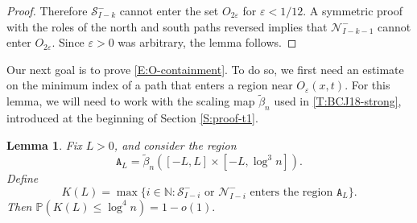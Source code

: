\documentclass[11pt,twoside]{amsart}
\theoremstyle{plain}
\newtheorem{lem}[thm]{Lemma}
\numberwithin{quest}{section}
\theoremstyle{remark}
\numberwithin{rem}{section}
\theoremstyle{definition}
\newcommand{\eps}{\varepsilon}
\newcommand{\N}{\mathbb{N}}
\renewcommand{\P}{\mathbb{P}}
\newcommand{\cS}{\mathcal{S}}
\newcommand{\cN}{\mathcal{N}}
\renewcommand{\tt}[1]{{\mathtt{#1}}}
\begin{document}
\begin{proof}
    Therefore $\cS_{I-k}^-$ cannot enter the set $O_{2\eps}$ for $\eps < 1/12$. A symmetric proof with the roles of the north and south paths reversed implies that $\cN_{I-k-1}^-$ cannot enter $O_{2\eps}$. Since $\eps > 0$ was arbitrary, the lemma follows.
	\end{proof}
	
	Our next goal is to prove \eqref{E:O-containment}. To do so, we first need an estimate on the minimum index of a path that enters a region near $O_\eps(x, t)$.	For this lemma, we will need to work with the scaling map $\tilde \beta_n$ used in \cref{T:BCJ18-strong}, introduced at the beginning of Section \ref{S:proof-t1}.
	
	\begin{lem}
	\label{L:large-paths}
	Fix $L > 0$, and consider the region
	$$
	\tt{A}_L = \tilde \beta_n([-L, L] \times [-L, \log^3 n]).
	$$
	Define
	$$
	K(L) = \max \{ i \in \N : \cS_{I-i}^- \text{ or } \cN_{I-i}^- \text{ enters the region } \tt{A}_L\}.
	$$
	Then
	$
	\P(K(L) \le \log^4 n) = 1 - o(1).
	$
	\end{lem}
	
\end{document}
